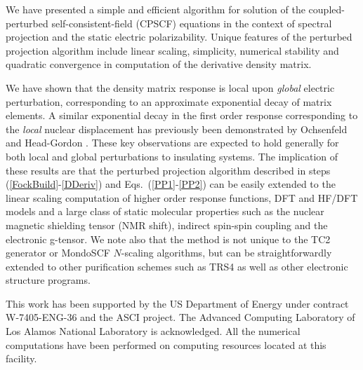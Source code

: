 \documentclass[prl,aps,twocolumn,showpacs,twocolumngrid,superbib]{revtex4}
\begin{document}
We have presented a simple and efficient algorithm for solution of the coupled-perturbed 
self-consistent-field (CPSCF) equations in the context of spectral projection and the static 
electric polarizability. Unique features of the perturbed projection algorithm include linear 
scaling, simplicity, numerical stability and quadratic convergence in computation of the derivative 
density matrix.  

We have shown that the density matrix response is local upon {\em global} electric perturbation, 
corresponding to an approximate exponential decay of matrix elements. A similar exponential decay 
in the first order response corresponding to the {\em local} nuclear displacement has previously been
demonstrated by Ochsenfeld and Head-Gordon \cite{Ochsenfeld_1997}.   These key observations are expected to
hold generally for both local and global perturbations to insulating systems.  The implication of these 
results are that the perturbed projection algorithm described in steps (\ref{FockBuild}-\ref{DDeriv}) and
Eqs.~(\ref{PP1}-\ref{PP2}) can be easily extended to the linear scaling computation of higher order 
response functions, DFT and HF/DFT models and a large class of static molecular properties such as the 
nuclear magnetic shielding tensor (NMR shift), indirect spin-spin coupling and the electronic g-tensor.
We note also that the method is not unique to the TC2 generator or {\sc MondoSCF} $N$-scaling algorithms, 
but can be straightforwardly extended to other purification schemes such as TRS4 \cite{ANiklasson03} as
well as other electronic structure programs.


 This work has been supported by the US Department of Energy 
 under contract W-7405-ENG-36 and the ASCI project.  
 The Advanced Computing Laboratory of Los 
 Alamos National Laboratory is acknowledged.
 All the numerical computations have been
 performed on computing resources located at this facility.


\end{document}
